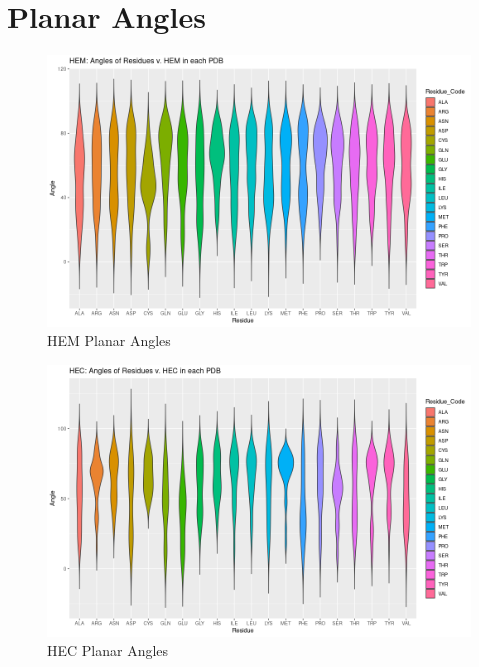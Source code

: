 \section{Planar Angles}
	\begin{figure}
		\caption{HEM Planar Angles}
		\label{figs:HEM_planarAngles}
		\includegraphics[width=\linewidth]{7A/HEM_planarAngles}
	\end{figure}
	
	\begin{figure}
		\caption{HEC Planar Angles}
		\label{figs:HEC_planarAngles}
		\includegraphics[width=\linewidth]{7A/HEC_planarAngles}
	\end{figure}
	
